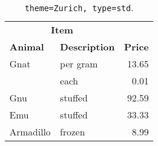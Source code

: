 \begin{table}[!htb]
\large
\centering
\begin{tabular}{llr}
\toprule
\multicolumn{2}{c}{\textbf{Item}} & \multicolumn{1}{c}{\textbf{}}            \\
\cmidrule(r){1-2}
\textbf{Animal}                   & \multicolumn{1}{c}{\textbf{Description}} & \multicolumn{1}{c}{\textbf{Price}} \\
\midrule
Gnat      & per gram & 13.65 \\
          & each     & 0.01  \\
Gnu       & stuffed  & 92.59 \\
Emu       & stuffed  & 33.33 \\
Armadillo & frozen   & 8.99  \\
\bottomrule
\end{tabular}
\caption[\texttt{theme=Zurich, type=std}]{\texttt{theme=Zurich, type=std}. }
\end{table}
